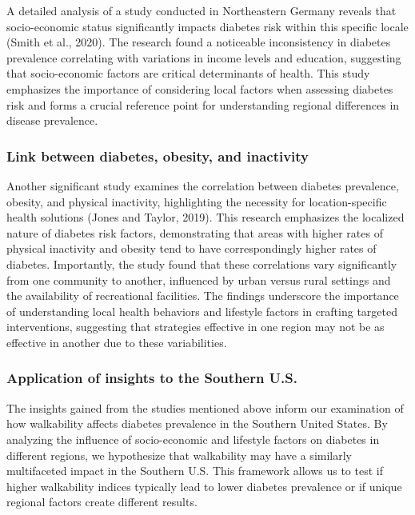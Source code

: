 \documentclass[
]{article}
\begin{document}
A detailed analysis of a study conducted in Northeastern Germany reveals
that socio-economic status significantly impacts diabetes risk within
this specific locale (Smith et al., 2020). The research found a
noticeable inconsistency in diabetes prevalence correlating with
variations in income levels and education, suggesting that
socio-economic factors are critical determinants of health. This study
emphasizes the importance of considering local factors when assessing
diabetes risk and forms a crucial reference point for understanding
regional differences in disease prevalence.

\subsubsection{Link between diabetes, obesity, and
inactivity}\label{link-between-diabetes-obesity-and-inactivity}

Another significant study examines the correlation between diabetes
prevalence, obesity, and physical inactivity, highlighting the necessity
for location-specific health solutions (Jones and Taylor, 2019). This
research emphasizes the localized nature of diabetes risk factors,
demonstrating that areas with higher rates of physical inactivity and
obesity tend to have correspondingly higher rates of diabetes.
Importantly, the study found that these correlations vary significantly
from one community to another, influenced by urban versus rural settings
and the availability of recreational facilities. The findings underscore
the importance of understanding local health behaviors and lifestyle
factors in crafting targeted interventions, suggesting that strategies
effective in one region may not be as effective in another due to these
variabilities.

\subsubsection{Application of insights to the Southern
U.S.}\label{application-of-insights-to-the-southern-u.s.}

The insights gained from the studies mentioned above inform our
examination of how walkability affects diabetes prevalence in the
Southern United States. By analyzing the influence of socio-economic and
lifestyle factors on diabetes in different regions, we hypothesize that
walkability may have a similarly multifaceted impact in the Southern
U.S. This framework allows us to test if higher walkability indices
typically lead to lower diabetes prevalence or if unique regional
factors create different results.
\end{document}
